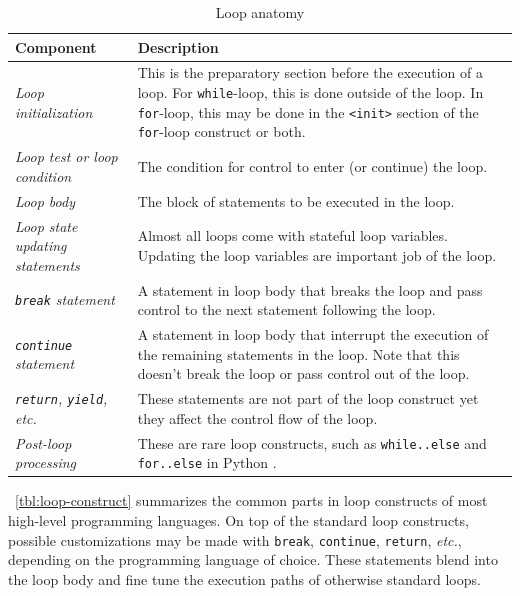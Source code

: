 \documentclass[oneside,11pt]{book}
\theoremstyle{definition}
\theoremstyle{remark}
\newcommand{\code}[1]{\mbox{\lstinline{#1}}}
\newcommand{\python}{Python }
\begin{document}
\begin{table}[htb]
    \begin{center}
        \caption{Loop anatomy\label{tbl:loop-construct}}
        \begin{tabular}{l|p{10cm}}
            \hline
            Component & Description \\
            \hline
            \emph{Loop initialization} &
            This is the preparatory section before the execution of a loop.
            For \code{while}-loop, this is done outside of the loop.
            In \code{for}-loop, this may be done in the \code{<init>} section of the
            \code{for}-loop construct or both.\\
            \emph{Loop test or loop condition} &
            The condition for control to enter (or continue) the loop. \\
            \emph{Loop body} &
            The block of statements to be executed in the loop. \\
            \emph{Loop state updating statements} & Almost all loops come with stateful loop
            variables.
            Updating the loop variables are important job of the loop.\\
            \emph{\code{break} statement} &
            A statement in loop body that breaks the loop and pass control to the next statement
            following the loop. \\
            \emph{\code{continue} statement} &
            A statement in loop body that interrupt the execution of the remaining
            statements in the loop.
            Note that this doesn't break the loop or pass control out of the loop. \\
            \emph{\code{return}, \code{yield}, \textit{etc.}} & These statements are
            not part of the loop construct yet they affect the control flow of the loop. \\
            \emph{Post-loop processing} &
            These are rare loop constructs, such as \code{while..else} and \code{for..else}
            in \python. \\
            \hline
        \end{tabular}
    \end{center}
\end{table}


~\autoref{tbl:loop-construct} summarizes the common parts in loop constructs of most high-level
programming languages.
On top of the standard loop constructs, possible customizations may be made with \code{break},
\code{continue}, \code{return}, \textit{etc.}, depending on the programming language of choice.
These statements blend into the loop body and fine tune the execution paths of otherwise standard
loops.
\end{document}
